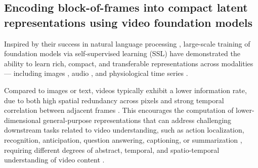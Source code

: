 \subsection{Encoding block-of-frames into compact latent representations using video foundation models}




Inspired by their success in natural language processing \cite{Bert, openai2024gpt4technicalreport}, large-scale training of foundation models via self-supervised learning (SSL) have demonstrated the ability to learn rich, compact, and transferable representations across modalities — including images \cite{Radford2021LearningTV}, audio \cite{pmlr-v162-baevski22a}, and physiological time series \cite{Banville2021-qz, abbaspourazad2024largescale}.




Compared to images or text, videos typically exhibit a lower information rate, due to both high spatial redundancy across pixels and strong temporal correlation between adjacent frames \cite{videomae}. This encourages the computation of lower-dimensional general-purpose representations that can address challenging downstream tasks related to video understanding, such as action localization, recognition, anticipation,  question answering, captioning, or summarization \cite{ego4D}, requiring different degrees of abstract, temporal, and spatio-temporal understanding of video content \cite{madan2024foundationmodelsvideounderstanding}. 

